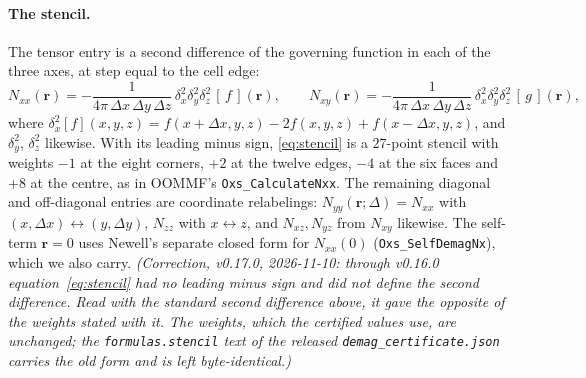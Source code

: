 \documentclass[11pt]{amsart}
\newcommand{\Nxx}{N_{xx}}
\newcommand{\Nxy}{N_{xy}}
\theoremstyle{plain}
\theoremstyle{definition}
\theoremstyle{remark}
\begin{document}
\paragraph{The stencil.}
The tensor entry is a second difference of the governing function in each of the
three axes, at step equal to the cell edge:
\begin{equation}
  \Nxx(\mathbf r) = -\frac{1}{4\pi\,\Delta x\,\Delta y\,\Delta z}\,
  \delta^{2}_{x}\delta^{2}_{y}\delta^{2}_{z}\,[\,f\,](\mathbf r),
  \qquad
  \Nxy(\mathbf r) = -\frac{1}{4\pi\,\Delta x\,\Delta y\,\Delta z}\,
  \delta^{2}_{x}\delta^{2}_{y}\delta^{2}_{z}\,[\,g\,](\mathbf r),
  \label{eq:stencil}
\end{equation}
where $\delta^{2}_{x}[f](x,y,z)=f(x+\Delta x,y,z)-2f(x,y,z)+f(x-\Delta x,y,z)$, and
$\delta^{2}_{y}$, $\delta^{2}_{z}$ likewise. With its leading minus sign,
\eqref{eq:stencil} is a $27$-point stencil with weights $-1$ at the eight
corners, $+2$ at the twelve edges, $-4$ at the six faces and $+8$ at the centre,
as in OOMMF's \texttt{Oxs\_CalculateNxx}. The remaining diagonal and
off-diagonal entries are coordinate relabelings:
$N_{yy}(\mathbf r;\Delta)=N_{xx}$ with $(x,\Delta x)\leftrightarrow(y,\Delta y)$,
$N_{zz}$ with $x\leftrightarrow z$, and $N_{xz},N_{yz}$ from $N_{xy}$ likewise.
The self-term $\mathbf r=0$ uses Newell's separate closed form for $N_{xx}(0)$
(\texttt{Oxs\_SelfDemagNx}), which we also carry. \emph{(Correction, v0.17.0,
2026-11-10: through v0.16.0 equation~\eqref{eq:stencil} had no leading minus sign
and did not define the second difference. Read with the standard second
difference above, it gave the opposite of the weights stated with it. The
weights, which the certified values use, are unchanged; the
\texttt{formulas.stencil} text of the released \texttt{demag\_certificate.json}
carries the old form and is left byte-identical.)}
\end{document}

